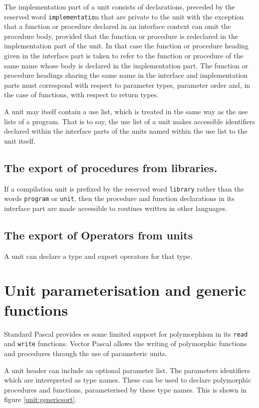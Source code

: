 {The implementation part of a unit consists of declarations,
preceded by the reserved word \texttt{implementatio}n
that are private to the unit with the exception that a function or procedure
declared in an interface context can omit the procedure body, provided that
the function or procedure is redeclared in the implementation part of the unit.
In that case the function or procedure heading given in the interface part is
taken to refer to the function or procedure of the same name whose body is declared
in the implementation part. The function or procedure headings sharing the same
name in the interface and implementation parts must correspond with respect
to parameter types, parameter order and, in the case of functions, with respect
to return types.

A unit may itself contain a use list, which is treated in the same way as the
use lists of a program. That is to say, the use list of a unit makes accessible
identifiers declared within the interface parts of the units named within the
use list to the unit itself.


\subsection{The export of procedures from libraries.}

If a compilation unit is prefixed by the reserved word \texttt{library} rather
than the words \texttt{program} or \texttt{unit}, then the procedure and function
declarations in its interface part are made accessible to routines written in
other languages.


\subsection{The export of Operators from units}

A unit can declare a type and export operators for that type.

\section{Unit parameterisation and generic functions}
Standard Pascal provides es some limited support for polymorphism
in its {\tt read} and {\tt write} functions.
Vector Pascal allows the writing of polymorphic functions and
procedures through the use of parameteric units.

A unit header can include an optional parameter list. The parameters identifiers which are
interepreted as type names. These can be used to declare polymorphic procedures and
functions, parameterised by these type names.
This is shown in figure \ref{unit:genericsort}.

}
